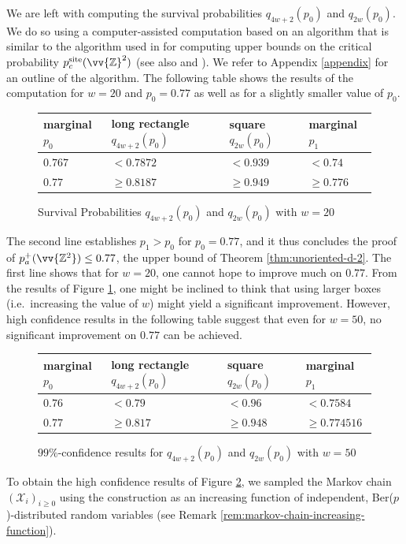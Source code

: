 \documentclass[11pt]{article}
\newcommand{\Z}{\mathbb{Z}}
\theoremstyle{remark}
\begin{document}
We are left with computing the survival probabilities $q_{4w+2}(p_0)$ and $q_{2w}(p_0)$. We do so using a computer-assisted computation based on an algorithm that is similar to the algorithm used in \cite{Balister1993}  for computing upper bounds on the critical probability  $p^{\mathrm{site}}_c(\vv{\mathbb{Z}}^2)$ (see also \cite{durrett1992stochastic} and \cite{balister1994improved}). We refer to Appendix \ref{appendix} for an outline of the algorithm. 
The following table shows the results of the computation for $w=20$ and $p_0= 0.77$ as well as for a slightly smaller value of $p_0$.
\begin{figure}[H]
    \centering
    \begin{tabular}{ |p{2cm}||p{4.5cm}|p{4.5cm}|p{2cm}|  }
 \hline
 marginal $p_0$& long rectangle $q_{4w+2}(p_0)$ & square $q_{2w}(p_0)$ & marginal $p_1$\\
 \hline
 $0.767$   & $< 0.7872$ & $< 0.939$  &   $< 0.74$\\
 $0.77$   & $\geq 0.8187$ & $\geq 0.949$  &   $\geq 0.776$\\
 \hline
\end{tabular}
    \caption{Survival Probabilities $q_{4w+2}(p_0)$ and $q_{2w}(p_0)$ with $w=20$}
    \label{fig:Survival_Probabilities}
\end{figure}
The second line establishes $p_1 >p_0$ for $p_0 = 0.77$, and it thus concludes the proof of $p_a^+(\vv{\Z^2}) \le 0.77$, the upper bound of Theorem \ref{thm:unoriented-d-2}. 
The first line  shows that for $w=20$, one cannot hope to improve much on $0.77$. From the results of Figure \ref{fig:Survival_Probabilities}, one might be inclined to think that using larger boxes (i.e.\ increasing the value of $w$) might yield a significant improvement. However, high confidence results in the following table suggest that even for $w=50$, no significant improvement on $0.77$ can be achieved.

\begin{figure}[H]
     \centering
    \begin{tabular}{ |p{2cm}||p{4.5cm}|p{4.5cm}|p{2cm}|  }
 \hline
 marginal $p_0$& long rectangle $q_{4w+2}(p_0)$ & square $q_{2w}(p_0)$ & marginal $p_1$\\
 \hline
 $0.76$   & $< 0.79$ & $< 0.96$  &   $< 0.7584$\\
 $0.77$   & $\geq 0.817$ & $\geq 0.948$  &   $\geq 0.774516$\\
 \hline
\end{tabular}
    \caption{$99\%$-confidence results for $q_{4w+2}(p_0)$ and $q_{2w}(p_0)$ with $w=50$}
    \label{fig:HighConfSurvival_Probabilities}
\end{figure}
To obtain the high confidence results of Figure \ref{fig:HighConfSurvival_Probabilities}, we sampled the Markov chain $(\mathcal{X}_i)_{i\ge 0}$ using the construction as an increasing function of independent, Ber($p$)-distributed random variables (see Remark \ref{rem:markov-chain-increasing-function}).
\end{document}
